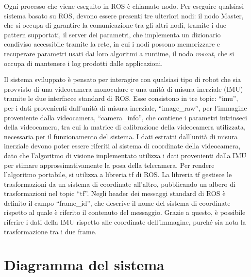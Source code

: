 Ogni processo che viene eseguito in ROS è chiamato nodo. Per eseguire qualsiasi sistema basato su ROS, devono essere presenti tre ulteriori nodi: il nodo Master, che si occupa di garantire la comunicazione tra gli altri nodi, tramite i due pattern supportati, il server dei parametri, che implementa un dizionario condiviso accessibile tramite la rete, in cui i nodi possono memorizzare e recuperare parametri usati dai loro algoritmi a runtime, il nodo \textit{rosout}, che si occupa di mantenere i log prodotti dalle applicazioni.

Il sistema sviluppato è pensato per interagire con qualsiasi tipo di robot che sia provvisto di una videocamera monoculare e una unità di misura inerziale (IMU) tramite le due interfacce standard di ROS.
Esse consistono in tre topic: ``imu'', per i dati provenienti dall'unità di misura inerziale, ``image\_raw'', per l'immagine proveniente dalla videocamera, ``camera\_info'', che contiene i parametri intrinseci della videocamera, tra cui la matrice di calibrazione della videocamera utilizzata, necessaria per il funzionamento del sistema.
I dati estratti dall'unità di misura inerziale devono poter essere riferiti al sistema di coordinate della videocamera, dato che l'algoritmo di visione implementato utilizza i dati provenienti dalla IMU per stimare approssimativamente la posa della telecamera.
Per rendere l'algoritmo portabile, si utilizza a libreria tf di ROS. La libreria tf gestisce le trasformazioni da un sistema di coordinate all'altro, pubblicando un albero di trasformazioni nel topic ``tf''.
Negli header dei messaggi standard di ROS è definito il campo ``frame\_id'', che descrive il nome del sistema di coordinate rispetto al quale è riferito il contenuto del messaggio. Grazie a questo, è possibile riferire i dati della IMU rispetto alle coordinate dell'immagine, purché sia nota la trasformazione tra i due frame.

\section{Diagramma del sistema}

